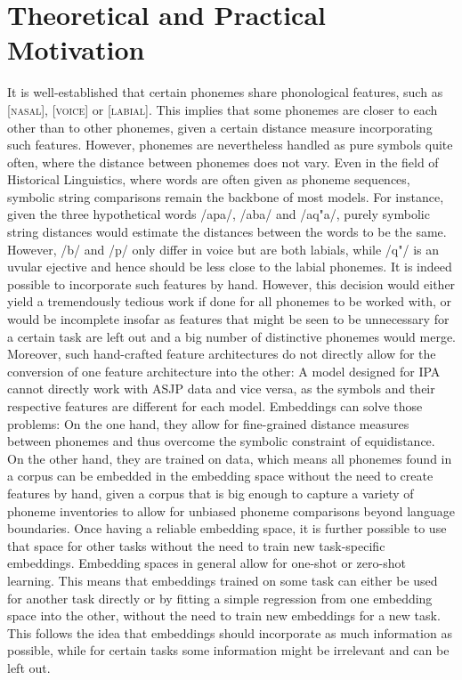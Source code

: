 \documentclass[11pt]{article}
\begin{document}
\section{Theoretical and Practical Motivation}
It is well-established that certain phonemes share phonological features, such as \textsc{[nasal]}, \textsc{[voice]} or \textsc{[labial]}. This implies that some phonemes are closer to each other than to other phonemes, given a certain distance measure incorporating such features. However, phonemes are nevertheless handled as pure symbols quite often, where the distance between phonemes does not vary. Even in the field of Historical Linguistics, where words are often given as phoneme sequences, symbolic string comparisons remain the backbone of most models. For instance, given the three hypothetical words /apa/, /aba/ and /aq"a/, purely symbolic string distances would estimate the distances between the words to be the same. However, /b/ and /p/ only differ in voice but are both labials, while /q"/ is an uvular ejective and hence should be less close to the labial phonemes.
It is indeed possible to incorporate such features by hand. However, this decision would either yield a tremendously tedious work if done for all phonemes to be worked with, or would be incomplete insofar as features that might be seen to be unnecessary for a certain task are left out and a big number of distinctive phonemes would merge. Moreover, such hand-crafted feature architectures do not directly allow for the conversion of one feature architecture into the other: A model designed for IPA cannot directly work with ASJP data and vice versa, as the symbols and their respective features are different for each model.
Embeddings can solve those problems: On the one hand, they allow for fine-grained distance measures between phonemes and thus overcome the symbolic constraint of equidistance. On the other hand, they are trained on data, which means all phonemes found in a corpus can be embedded in the embedding space without the need to create features by hand, given a corpus that is big enough to capture a variety of phoneme inventories to allow for unbiased phoneme comparisons beyond language boundaries.
Once having a reliable embedding space, it is further possible to use that space for other tasks without the need to train new task-specific embeddings. Embedding spaces in general allow for one-shot or zero-shot learning. This means that embeddings trained on some task can either be used for another task directly or by fitting a simple regression from one embedding space into the other, without the need to train new embeddings for a new task. This follows the idea that embeddings should incorporate as much information as possible, while for certain tasks some information might be irrelevant and can be left out.
\end{document}
